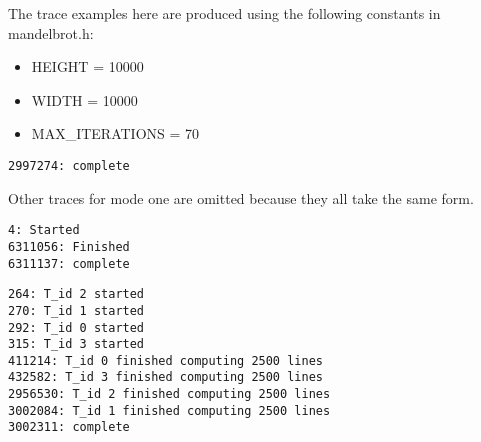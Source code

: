 The trace examples here are produced using the following constants in mandelbrot.h:

\begin{itemize}
\item HEIGHT = 10000
\item WIDTH = 10000
\item MAX\_ITERATIONS = 70
\end{itemize}

\begin{lstlisting}[label=apptracese1,caption=An example trace produced by the `semandelbrot' binary. Trace mode is one.]
2997274: complete
\end{lstlisting}

Other traces for mode one are omitted because they all take the same form.
\\

\begin{lstlisting}[label=apptracese,caption=An example trace produced by the `semandelbrot' binary. Trace mode is two.]
4: Started
6311056: Finished
6311137: complete
\end{lstlisting}

\begin{lstlisting}[label=apptracens,caption=An example trace produced by the `nsmandelbrot' binary. Trace mode is two.]
264: T_id 2 started
270: T_id 1 started
292: T_id 0 started
315: T_id 3 started
411214: T_id 0 finished computing 2500 lines
432582: T_id 3 finished computing 2500 lines
2956530: T_id 2 finished computing 2500 lines
3002084: T_id 1 finished computing 2500 lines
3002311: complete
\end{lstlisting}

